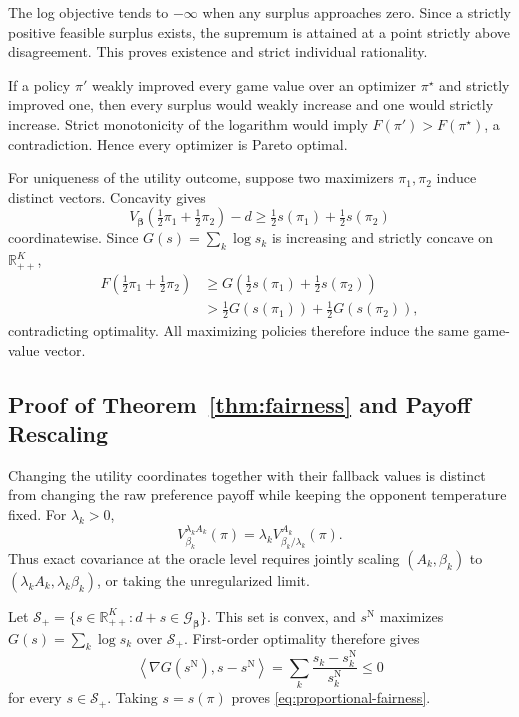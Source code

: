 \documentclass{article}
\theoremstyle{remark}
\theoremstyle{plain}
\newcommand{\G}{\mathcal{G}}
\newcommand{\R}{\mathbb{R}}
\begin{document}
The log objective tends to $-\infty$ when any surplus approaches zero. Since a strictly positive feasible surplus exists, the supremum is attained at a point strictly above disagreement. This proves existence and strict individual rationality.

If a policy $\pi'$ weakly improved every game value over an optimizer $\pi^\star$ and strictly improved one, then every surplus would weakly increase and one would strictly increase. Strict monotonicity of the logarithm would imply $F(\pi')>F(\pi^\star)$, a contradiction. Hence every optimizer is Pareto optimal.

For uniqueness of the utility outcome, suppose two maximizers $\pi_1,\pi_2$ induce distinct vectors. Concavity gives
\[
V_{\boldsymbol\beta}\!\left(\tfrac12\pi_1+\tfrac12\pi_2\right)-d
\ge
\tfrac12s(\pi_1)+\tfrac12s(\pi_2)
\]
coordinatewise. Since $G(s)=\sum_k\log s_k$ is increasing and strictly concave on $\R_{++}^K$,
\begin{align*}
F\!\left(\tfrac12\pi_1+\tfrac12\pi_2\right)
&\ge
G\!\left(\tfrac12s(\pi_1)+\tfrac12s(\pi_2)\right)\\
&>
\tfrac12G(s(\pi_1))+\tfrac12G(s(\pi_2)),
\end{align*}
contradicting optimality. All maximizing policies therefore induce the same game-value vector.

\subsection{Proof of Theorem~\ref{thm:fairness} and Payoff Rescaling}
\label{app:scale}
Changing the utility coordinates together with their fallback values is distinct from changing the raw preference payoff while keeping the opponent temperature fixed. For $\lambda_k>0$,
\begin{equation}
V_{\beta_k}^{\lambda_k A_k}(\pi)
=\lambda_k V_{\beta_k/\lambda_k}^{A_k}(\pi).
\label{eq:raw-scale}
\end{equation}
Thus exact covariance at the oracle level requires jointly scaling $(A_k,\beta_k)$ to $(\lambda_kA_k,\lambda_k\beta_k)$, or taking the unregularized limit.

Let $\mathcal S_+=\{s\in\R_{++}^K: d+s\in\G_{\boldsymbol\beta}\}$. This set is convex, and $s^{\mathrm N}$ maximizes $G(s)=\sum_k\log s_k$ over $\mathcal S_+$. First-order optimality therefore gives
\[
\left\langle\nabla G(s^{\mathrm N}),s-s^{\mathrm N}\right\rangle
=
\sum_k\frac{s_k-s_k^{\mathrm N}}{s_k^{\mathrm N}}
\le0
\]
for every $s\in\mathcal S_+$. Taking $s=s(\pi)$ proves \eqref{eq:proportional-fairness}.
\end{document}
